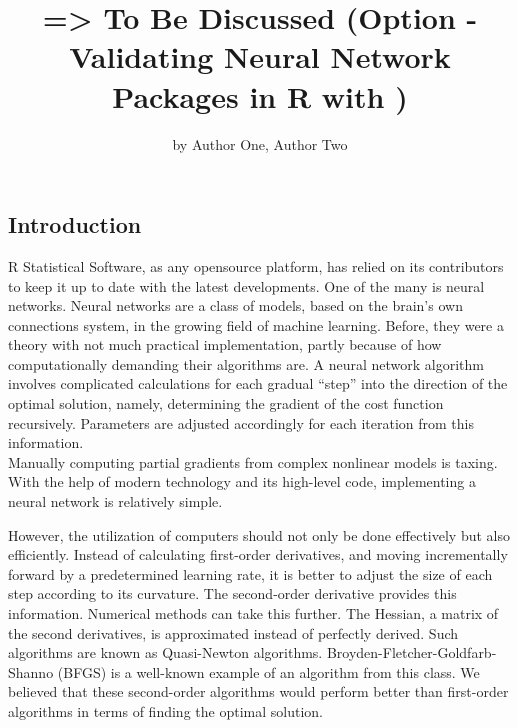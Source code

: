 \title{=\textgreater{} To Be Discussed (Option - Validating Neural Network
Packages in R with )}
\author{by Author One, Author Two}

\maketitle


\hypertarget{introduction}{%
\subsection{Introduction}\label{introduction}}

R Statistical Software, as any opensource platform, has relied on its
contributors to keep it up to date with the latest developments. One of
the many is neural networks. Neural networks are a class of models,
based on the brain's own connections system, in the growing field of
machine learning. Before, they were a theory with not much practical
implementation, partly because of how computationally demanding their
algorithms are. A neural network algorithm involves complicated
calculations for each gradual ``step'' into the direction of the optimal
solution, namely, determining the gradient of the cost function
recursively. Parameters are adjusted accordingly for each iteration from
this information.\\
Manually computing partial gradients from complex nonlinear models is
taxing. With the help of modern technology and its high-level code,
implementing a neural network is relatively simple.

However, the utilization of computers should not only be done
effectively but also efficiently. Instead of calculating first-order
derivatives, and moving incrementally forward by a predetermined
learning rate, it is better to adjust the size of each step according to
its curvature. The second-order derivative provides this information.
Numerical methods can take this further. The Hessian, a matrix of the
second derivatives, is approximated instead of perfectly derived. Such
algorithms are known as Quasi-Newton algorithms.
Broyden-Fletcher-Goldfarb-Shanno (BFGS) is a well-known example of an
algorithm from this class. We believed that these second-order
algorithms would perform better than first-order algorithms in terms of
finding the optimal solution.

